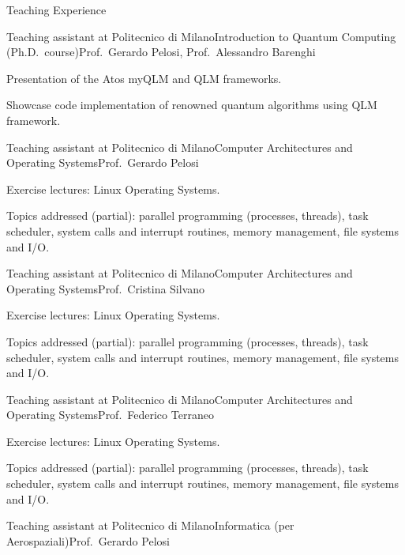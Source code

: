 \documentclass[
	a4paper, %
	10pt, %
]{tresume} %
\begin{document}
\begin{tSection}{Teaching Experience}
  \begin{tSubsection}{Teaching assistant at Politecnico di Milano}{}{Introduction
    to Quantum Computing (Ph.D.\ course)}{Prof.\ Gerardo Pelosi, Prof.\ Alessandro Barenghi}
  \item Presentation of the Atos myQLM and QLM frameworks.
  \item Showcase code implementation of renowned quantum algorithms using QLM
    framework.
  \end{tSubsection}
  \begin{tSubsection}{Teaching assistant at Politecnico di Milano}{}{Computer Architectures and Operating Systems}{Prof.\ Gerardo Pelosi}
  \item Exercise lectures: Linux Operating Systems.
  \item Topics addressed (partial): parallel programming (processes, threads),
    task scheduler, system calls and interrupt routines, memory management, file
    systems and I/O.
  \end{tSubsection}
  \begin{tSubsection}{Teaching assistant at Politecnico di Milano}{}{Computer Architectures and
      Operating Systems}{Prof.\ Cristina Silvano }
  \item Exercise lectures: Linux Operating Systems.
  \item Topics addressed (partial): parallel programming (processes, threads),
    task scheduler, system calls and interrupt routines, memory management, file
    systems and I/O.
  \end{tSubsection}
  \begin{tSubsection}{Teaching assistant at Politecnico di Milano}{}{Computer Architectures and
      Operating Systems}{Prof.\ Federico Terraneo}
  \item Exercise lectures: Linux Operating Systems.
  \item Topics addressed (partial): parallel programming (processes, threads),
    task scheduler, system calls and interrupt routines, memory management, file
    systems and I/O.
  \end{tSubsection}
  \begin{tSubsection}{Teaching assistant at Politecnico di Milano}{}{Informatica (per Aerospaziali)}{Prof.\ Gerardo Pelosi}

\end{tSubsection}
\end{tSection}
\end{document}
